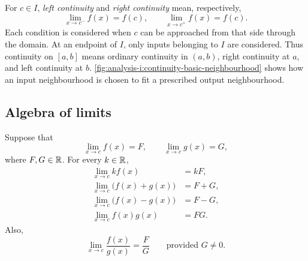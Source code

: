 For $c\in I$, \emph{left continuity} and \emph{right continuity}
mean, respectively,
\[
  \lim_{x\to c^-}f(x)=f(c),\qquad
  \lim_{x\to c^+}f(x)=f(c).
\]
Each condition is considered when $c$ can be approached from that
side through the domain.
At an endpoint of $I$, only inputs belonging to $I$ are considered.
Thus continuity on $[a,b]$ means ordinary continuity in $(a,b)$,
right continuity at $a$, and left continuity at $b$.
\autoref{fig:analysis-i:continuity-basic-neighbourhood} shows how an input
neighbourhood is chosen to fit a prescribed output neighbourhood.


\begin{marginfigure}
  \centering
  
  \caption[Input and output neighbourhoods for continuity.]{%
    A schematic continuous graph. Inputs within
    $\delta$ of $c$ have outputs within $\varepsilon$ of $f(c)$.
    The graph over the shaded input strip lies inside the horizontal
    output band. The arrows measure $2\delta$ and $2\varepsilon$.}
  \label{fig:analysis-i:continuity-basic-neighbourhood}
\end{marginfigure}

\subsection{Algebra of limits}

\begin{proposition}
  \label{thm:analysis-i:function-limit-laws}
  Suppose that
  \[
    \lim_{x\to c}f(x)=F,
    \qquad
    \lim_{x\to c}g(x)=G,
  \]
  where $F,G\in\mathbb{R}$. For every $k\in\mathbb{R}$,
  \begin{align*}
    \lim_{x\to c}k f(x)&=kF,\\
    \lim_{x\to c}\bigl(f(x)+g(x)\bigr)&=F+G,\\
    \lim_{x\to c}\bigl(f(x)-g(x)\bigr)&=F-G,\\
    \lim_{x\to c}f(x)g(x)&=FG.
  \end{align*}
  Also,
  \[
    \lim_{x\to c}\frac{f(x)}{g(x)}=\frac{F}{G}
    \qquad\text{provided }G\ne0.
  \]
\end{proposition}


